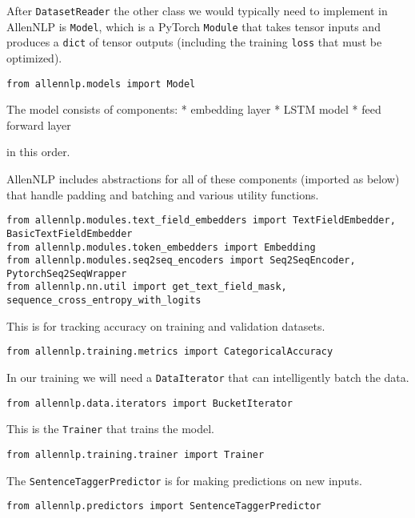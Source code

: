 \documentclass[
]{article}
\begin{document}
After \texttt{DatasetReader} the other class we would typically need to
implement in AllenNLP is \texttt{Model}, which is a PyTorch
\texttt{Module} that takes tensor inputs and produces a \texttt{dict} of
tensor outputs (including the training \texttt{loss} that must be
optimized).

\begin{verbatim}
from allennlp.models import Model
\end{verbatim}

The model consists of components: * embedding layer * LSTM model * feed
forward layer

in this order.

AllenNLP includes abstractions for all of these components (imported as
below) that handle padding and batching and various utility functions.

\begin{verbatim}
from allennlp.modules.text_field_embedders import TextFieldEmbedder, BasicTextFieldEmbedder
from allennlp.modules.token_embedders import Embedding
from allennlp.modules.seq2seq_encoders import Seq2SeqEncoder, PytorchSeq2SeqWrapper
from allennlp.nn.util import get_text_field_mask, sequence_cross_entropy_with_logits
\end{verbatim}

This is for tracking accuracy on training and validation datasets.

\begin{verbatim}
from allennlp.training.metrics import CategoricalAccuracy
\end{verbatim}

In our training we will need a \texttt{DataIterator} that can
intelligently batch the data.

\begin{verbatim}
from allennlp.data.iterators import BucketIterator
\end{verbatim}

This is the \texttt{Trainer} that trains the model.

\begin{verbatim}
from allennlp.training.trainer import Trainer
\end{verbatim}

The \texttt{SentenceTaggerPredictor} is for making predictions on new
inputs.

\begin{verbatim}
from allennlp.predictors import SentenceTaggerPredictor
\end{verbatim}
\end{document}
